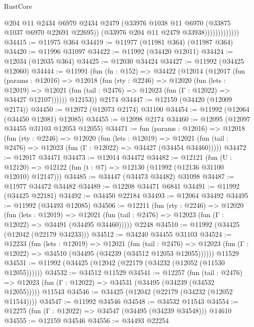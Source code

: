 \begin{lexlean}{RustCore}
\begin{coremodule}
                            @204
                            @11
                            @2434
                            @6970
                            @2434
                            @2479
                            (@33976 @1038 @11 @6970 (@33875 @1037 @6970 @22691 @22695))
                            (@33976 @204 @11 @2479 @33938)))))))))))))
@34415 := @11975 @364
@34419 := @11977 (@11981 @364) (@11987 @364)
@34420 := @11996 @31097
@34422 := @11992 (@34420 @12011)
@34424 := @12034 (@12035 @364)
@34425 := @12030 @34424
@34427 := @11992 (@34425 @12060)
@34444 := @11991
    (fun (fn : @152) =>
    @34422
      (@12014
        (@12017
          (fun (params : @12016) =>
          @12018
            (fun (rty : @2246) =>
            @12020
              (fun (lets : @12019) =>
              @12021 (fun (tail : @2476) => @12023 (fun (Γ : @12022) => @34427 @12107))))))
        @12153))
    @2174
@34447 := @12159 (@34420 (@12009 @2174))
@34450 := @12072 (@12073 @2174) @31100
@34454 := @11992 (@12064 (@34450 @12081) @12085)
@34455 := @12098 @2174
@34460 := @12095 (@12097 @34455 @31103 @12053 @12055)
@34471 := fun (params : @12016) =>
  @12018
    (fun (rty : @2246) =>
    @12020
      (fun (lets : @12019) =>
      @12021 (fun (tail : @2476) => @12023 (fun (Γ : @12022) => @34427 (@34454 @34460)))))
@34472 := @12017 @34471
@34473 := @12014 @34472
@34482 := @12121
    (fun (U : @12120) => @12122 (fun (t : @7) => @12130 (@11992 (@12136 @31100 @12010) @12147)))
@34485 := @34447 (@34473 @34482) @31098
@34487 := @11977 @34472 @34482
@34489 := @12208 @34471 @6841
@34491 := @11992 (@34425 @22181)
@34492 := @34450 @22184
@34493 := @12064 @34492
@34495 := @11992 (@34493 @12085)
@34506 := @12211
    (fun (rty : @2246) =>
    @12020
      (fun (lets : @12019) =>
      @12021 (fun (tail : @2476) => @12023 (fun (Γ : @12022) => @34491 (@34495 @34460)))))
    @2248
@34510 := @11992 (@34425 (@12042 (@22179 @34233)))
@34512 := @34240 @34455 @31103
@34524 := @12233
    (fun (lets : @12019) =>
    @12021
      (fun (tail : @2476) =>
      @12023 (fun (Γ : @12022) => @34510 (@34495 (@34239 (@34512 @12053 @12055))))))
    @11529
@34531 := @11992 (@34425 (@12042 (@22179 (@34232 (@12052 (@11530 @12055))))))
@34532 := @34512 @11529
@34541 := @12257
    (fun (tail : @2476) => @12023 (fun (Γ : @12022) => @34531 (@34495 (@34239 (@34532 @12055)))))
    @11543
@34546 := @34425 (@12042 (@22179 (@34232 (@12052 @11544))))
@34547 := @11992 @34546
@34548 := @34532 @11543
@34554 := @12275 (fun (Γ : @12022) => @34547 (@34495 (@34239 @34548))) @14610
@34555 := @12159 @34546
@34556 := @34493 @22254

\end{coremodule}
\end{lexlean}
